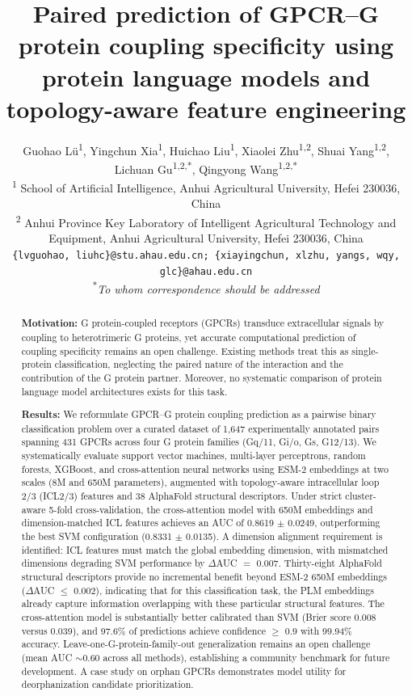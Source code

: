 \documentclass[11pt,a4paper]{article}
\title{\LARGE \bfseries Paired prediction of GPCR--G protein coupling specificity using protein language models and topology-aware feature engineering}
\author{
  Guohao L\"{u}\textsuperscript{1}, Yingchun Xia\textsuperscript{1}, Huichao Liu\textsuperscript{1}, Xiaolei Zhu\textsuperscript{1,2}, Shuai Yang\textsuperscript{1,2}, Lichuan Gu\textsuperscript{1,2,*}, Qingyong Wang\textsuperscript{1,2,*} \\
  \small
  \textsuperscript{1} School of Artificial Intelligence, Anhui Agricultural University, Hefei 230036, China \\
  \small
  \textsuperscript{2} Anhui Province Key Laboratory of Intelligent Agricultural Technology and Equipment, Anhui Agricultural University, Hefei 230036, China \\
  \small
  \texttt{\{lvguohao, liuhc\}@stu.ahau.edu.cn; \{xiayingchun, xlzhu, yangs, wqy, glc\}@ahau.edu.cn} \\
  \small \textsuperscript{*}\textit{To whom correspondence should be addressed}
}
\date{}
\begin{document}
\linenumbers

\pagestyle{fancy}
\fancyhf{}
\fancyhead[R]{\small\thepage}
\renewcommand{\headrulewidth}{0.4pt}
\addtolength{\headheight}{2pt}

\maketitle

\begin{abstract}

\textbf{Motivation:} G protein-coupled receptors (GPCRs) transduce extracellular signals by coupling to heterotrimeric G proteins, yet accurate computational prediction of coupling specificity remains an open challenge. Existing methods treat this as single-protein classification, neglecting the paired nature of the interaction and the contribution of the G protein partner. Moreover, no systematic comparison of protein language model architectures exists for this task.

\textbf{Results:} We reformulate GPCR--G protein coupling prediction as a pairwise binary classification problem over a curated dataset of 1,647 experimentally annotated pairs spanning 431 GPCRs across four G protein families (Gq/11, Gi/o, Gs, G12/13). We systematically evaluate support vector machines, multi-layer perceptrons, random forests, XGBoost, and cross-attention neural networks using ESM-2 embeddings at two scales (8M and 650M parameters), augmented with topology-aware intracellular loop 2/3 (ICL2/3) features and 38 AlphaFold structural descriptors. Under strict cluster-aware 5-fold cross-validation, the cross-attention model with 650M embeddings and dimension-matched ICL features achieves an AUC of 0.8619 $\pm$ 0.0249, outperforming the best SVM configuration (0.8331 $\pm$ 0.0135). A dimension alignment requirement is identified: ICL features must match the global embedding dimension, with mismatched dimensions degrading SVM performance by $\Delta$AUC $=$ 0.007. Thirty-eight AlphaFold structural descriptors provide no incremental benefit beyond ESM-2 650M embeddings ($\Delta$AUC $\le$ 0.002), indicating that for this classification task, the PLM embeddings already capture information overlapping with these particular structural features. The cross-attention model is substantially better calibrated than SVM (Brier score 0.008 versus 0.039), and 97.6\% of predictions achieve confidence $\ge$ 0.9 with 99.94\% accuracy. Leave-one-G-protein-family-out generalization remains an open challenge (mean AUC $\sim$0.60 across all methods), establishing a community benchmark for future development. A case study on orphan GPCRs demonstrates model utility for deorphanization candidate prioritization.


\end{abstract}
\end{document}
